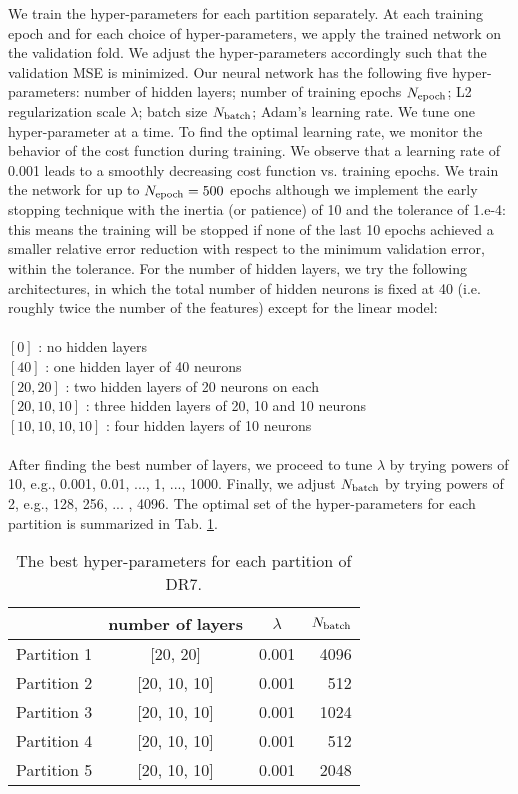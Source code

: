 We train the hyper-parameters for each partition separately. At each training epoch and for each choice of hyper-parameters, we apply the trained network on the validation fold. We adjust the hyper-parameters accordingly such that the validation MSE is minimized. Our neural network has the following five hyper-parameters: number of hidden layers; number of training epochs $N_{{\rm epoch}}$; L2 regularization scale $\lambda$; batch size $N_{{\rm batch}}$; Adam's learning rate. We tune one hyper-parameter at a time. To find the optimal learning rate, we monitor the behavior of the cost function during training. We observe that a learning rate of 0.001 leads to a smoothly decreasing cost function vs. training epochs. We train the network for up to $N_{\rm epoch} = 500$ epochs although we implement the early stopping technique with the inertia (or patience) of 10 and the tolerance of 1.e-4: this means the training will be stopped if none of the last 10 epochs achieved a smaller relative error reduction with respect to the minimum validation error, within the tolerance. For the number of hidden layers, we try the following architectures, in which the total number of hidden neurons is fixed at 40 (i.e. roughly twice the number of the features) except for the linear model:\\~\\
%
%
$[0]$  : no hidden layers \\
$[40]$ : one hidden layer of 40 neurons \\
$[20, 20]$ : two hidden layers of 20 neurons on each \\
$[20, 10, 10]$ : three hidden layers of 20, 10 and 10 neurons \\
$[10, 10, 10, 10]$ : four hidden layers of 10 neurons\\~\\
After finding the best number of layers, we proceed to tune $\lambda$ by trying powers of 10, e.g., 0.001, 0.01, ..., 1, ..., 1000. Finally, we adjust $N_{\rm batch}$ by trying powers of 2, e.g., 128, 256, ... , 4096. The optimal set of the hyper-parameters for each partition is summarized in Tab. \ref{tab:hparams}.\\

\begin{table}
    \centering
    \caption{The best hyper-parameters for each partition of DR7.}
    \label{tab:hparams}
    \begin{tabular}{lccr} %
        \hline
         & number of layers & $\lambda$ & $N_{\rm batch}$ \\
        \hline
        Partition 1 & [20, 20] & 0.001 & 4096\\
        Partition 2 & [20, 10, 10] & 0.001 & 512\\
        Partition 3 & [20, 10, 10] & 0.001 & 1024 \\
        Partition 4 & [20, 10, 10] & 0.001 & 512 \\
        Partition 5 &  [20, 10, 10] & 0.001 & 2048\\
    \end{tabular}
\end{table}

